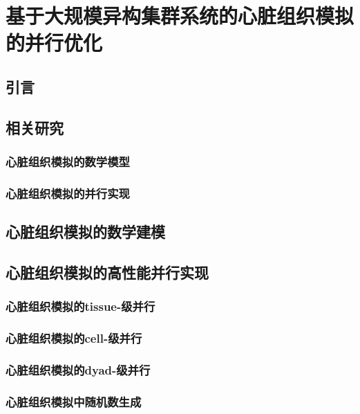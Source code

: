 \chapter{基于大规模异构集群系统的心脏组织模拟的并行优化}
\label{chapbmvc1}

\section{引言}




\section{相关研究}
\subsection{心脏组织模拟的数学模型}



\subsection{心脏组织模拟的并行实现}


\section{心脏组织模拟的数学建模}


\section{心脏组织模拟的高性能并行实现}

 \subsection{心脏组织模拟的tissue-级并行}
 
 \subsection{心脏组织模拟的cell-级并行}

\subsection{心脏组织模拟的dyad-级并行}

\subsection{心脏组织模拟中随机数生成}



